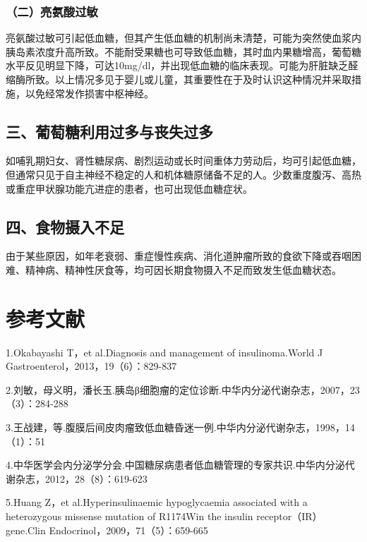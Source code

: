 \subsubsection{（二）亮氨酸过敏}

亮氨酸过敏可引起低血糖，但其产生低血糖的机制尚未清楚，可能为突然使血浆内胰岛素浓度升高所致。不能耐受果糖也可导致低血糖，其时血内果糖增高，葡萄糖水平反见明显下降，可达10mg/dl，并出现低血糖的临床表现。可能为肝脏缺乏醛缩酶所致。以上情况多见于婴儿或儿童，其重要性在于及时认识这种情况并采取措施，以免经常发作损害中枢神经。

\subsection{三、葡萄糖利用过多与丧失过多}

如哺乳期妇女、肾性糖尿病、剧烈运动或长时间重体力劳动后，均可引起低血糖，但通常只见于自主神经不稳定的人和机体糖原储备不足的人。少数重度腹泻、高热或重症甲状腺功能亢进症的患者，也可出现低血糖症状。

\subsection{四、食物摄入不足}

由于某些原因，如年老衰弱、重症慢性疾病、消化道肿瘤所致的食欲下降或吞咽困难、精神病、精神性厌食等，均可因长期食物摄入不足而致发生低血糖状态。

\protect\hypertarget{text00321.html}{}{}

\section{参考文献}

1.Okabayashi T，et al.Diagnosis and management of insulinoma.World J
Gastroenterol，2013，19（6）：829-837

2.刘敏，母义明，潘长玉.胰岛β细胞瘤的定位诊断.中华内分泌代谢杂志，2007，23（3）：284-288

3.王战建，等.腹膜后间皮肉瘤致低血糖昏迷一例.中华内分泌代谢杂志，1998，14（1）：51

4.中华医学会内分泌学分会.中国糖尿病患者低血糖管理的专家共识.中华内分泌代谢杂志，2012，28（8）：619-623

5.Huang Z，et al.Hyperinsulinaemic hypoglycaemia associated with a
heterozygous missense mutation of R1174Win the insulin
receptor（IR）gene.Clin Endocrinol，2009，71（5）：659-665

\protect\hypertarget{text00322.html}{}{}

